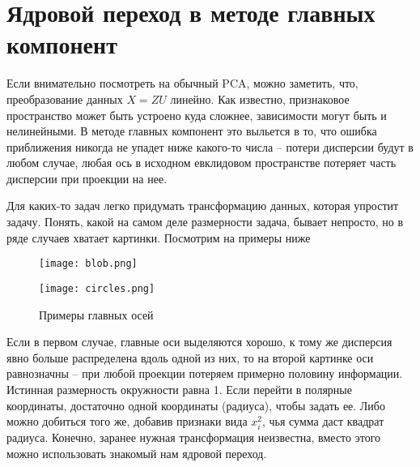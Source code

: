\documentclass[12pt,fleqn]{article}
\begin{document}
    
    
    
    
    


\section{Ядровой переход в методе главных компонент}

Если внимательно посмотреть на обычный PCA, можно заметить, что, преобразование данных $X=ZU$ линейно. Как известно, признаковое пространство может быть устроено куда сложнее, зависимости могут быть и нелинейными. В методе главных компонент это выльется в то, что ошибка приближения никогда не упадет ниже какого-то числа -- потери дисперсии будут в любом случае, любая ось в исходном евклидовом пространстве потеряет часть дисперсии при проекции на нее.

Для каких-то задач легко придумать трансформацию данных, которая упростит задачу. Понять, какой на самом деле размерности задача, бывает непросто, но в ряде случаев хватает картинки. Посмотрим на примеры ниже

\pagebreak

\begin{figure}
\centering
\begin{minipage}{0.5\textwidth}
  \centering
  \texttt{[image: blob.png]}
  \label{fig:sub1}
\end{minipage}%
\begin{minipage}{0.5\textwidth}
  \centering
  \texttt{[image: circles.png]}
  \label{fig:sub2}
\end{minipage}
\caption{Примеры главных осей}
\label{fig:test}
\end{figure}

Если в первом случае, главные оси выделяются хорошо, к тому же дисперсия явно больше распределена вдоль одной из них, то на второй картинке оси равнозначны -- при любой проекции потеряем примерно половину информации. Истинная размерность окружности равна 1. Если перейти в полярные координаты, достаточно одной координаты (радиуса), чтобы задать ее. Либо можно добиться того же, добавив признаки вида $x_i^2$, чья сумма даст квадрат радиуса. Конечно, заранее нужная трансформация неизвестна, вместо этого можно использовать знакомый нам ядровой переход.
\end{document}
